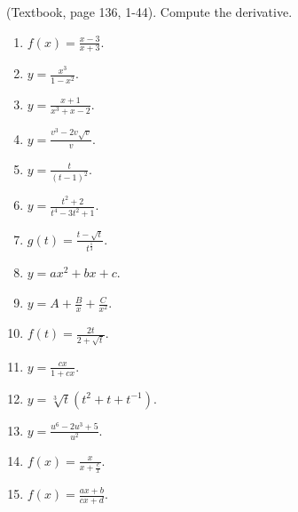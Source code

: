 (Textbook, page 136, 1-44). Compute the derivative.
\begin{multicols}{2}
\begin{enumerate}

\item $\displaystyle f(x)=\frac{x-3}{x+3}$.

\item $\displaystyle y=\frac{x^3}{1-x^2}$.

\item $\displaystyle y=\frac{x+1}{x^3+x-2}$.

\item $\displaystyle y=\frac{v^3-2v\sqrt{v}}{v}$.

\item \label{problemd/dt(t/(t-1)^2)}  $\displaystyle y=\frac{t}{(t-1)^2}$.

\item $\displaystyle y=\frac{t^2+2}{t^4-3t^2+1}$.

\item $\displaystyle g(t)=\frac{t-\sqrt{t}}{t^{\frac{1}{3}}}$.

\item $\displaystyle y=a x^2+b x + c$.

\item $\displaystyle y=A+\frac{B}x +\frac{C}{x^2}$.

\item $\displaystyle f(t)=\frac{2t}{2+\sqrt{t}}$.

\item $\displaystyle y=\frac{c x}{1+c x}$.

\item $\displaystyle y=\sqrt[3]{t}(t^2+t+t^{-1}) $.

\item $\displaystyle y=\frac{u^6-2u^3+5}{u^2}$.

\item $\displaystyle f(x)=\frac{x}{x+\frac{c}{x}}$.

\item $\displaystyle f(x)=\frac{a x+b}{c x+ d}$.

\end{enumerate}
\end{multicols}
